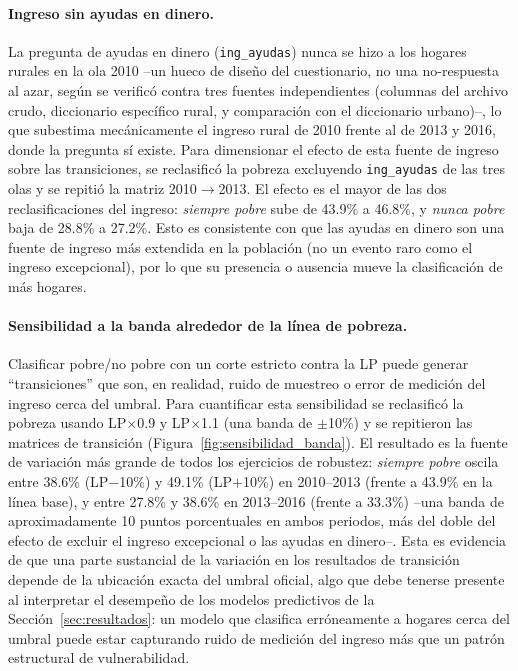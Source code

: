 \documentclass[12pt, letterpaper]{article}
\begin{document}
\paragraph{Ingreso sin ayudas en dinero.} La pregunta de ayudas en dinero
(\texttt{ing\_ayudas}) nunca se hizo a los hogares rurales en la ola 2010
--un hueco de diseño del cuestionario, no una no-respuesta al azar, según
se verificó contra tres fuentes independientes (columnas del archivo
crudo, diccionario específico rural, y comparación con el diccionario
urbano)--, lo que subestima mecánicamente el ingreso rural de 2010 frente
al de 2013 y 2016, donde la pregunta sí existe. Para dimensionar el efecto
de esta fuente de ingreso sobre las transiciones, se reclasificó la
pobreza excluyendo \texttt{ing\_ayudas} de las tres olas y se repitió la
matriz 2010$\rightarrow$2013. El efecto es el mayor de las dos
reclasificaciones del ingreso: \emph{siempre pobre} sube de
43.9\% a 46.8\%, y \emph{nunca pobre} baja de 28.8\% a 27.2\%. Esto es
consistente con que las ayudas en dinero son una fuente de ingreso más
extendida en la población (no un evento raro como el ingreso excepcional),
por lo que su presencia o ausencia mueve la clasificación de más hogares.

\paragraph{Sensibilidad a la banda alrededor de la línea de pobreza.}
Clasificar pobre/no pobre con un corte estricto contra la LP puede generar
``transiciones'' que son, en realidad, ruido de muestreo o error de
medición del ingreso cerca del umbral. Para cuantificar esta sensibilidad
se reclasificó la pobreza usando LP$\times$0.9 y LP$\times$1.1 (una banda
de $\pm$10\%) y se repitieron las matrices de transición
(Figura~\ref{fig:sensibilidad_banda}). El resultado es la fuente de
variación más grande de todos los ejercicios de robustez: \emph{siempre
pobre} oscila entre 38.6\% (LP$-$10\%) y 49.1\% (LP$+$10\%) en
2010--2013 (frente a 43.9\% en la línea base), y entre 27.8\% y 38.6\% en
2013--2016 (frente a 33.3\%) --una banda de aproximadamente 10 puntos
porcentuales en ambos periodos, más del doble del efecto de excluir el
ingreso excepcional o las ayudas en dinero--. Esta es evidencia de que una
parte sustancial de la variación en los resultados de transición depende
de la ubicación exacta del umbral oficial, algo que debe tenerse presente
al interpretar el desempeño de los modelos predictivos de la
Sección~\ref{sec:resultados}: un modelo que clasifica erróneamente a
hogares cerca del umbral puede estar capturando ruido de medición del
ingreso más que un patrón estructural de vulnerabilidad.
\end{document}
